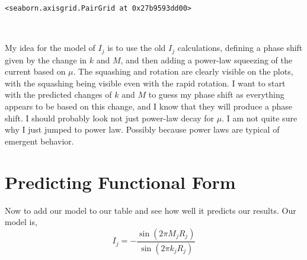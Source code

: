 \documentclass[11pt]{article}
\makeatletter
\newcommand{\boxspacing}{\kern\kvtcb@left@rule\kern\kvtcb@boxsep}
\newcommand{\prompt}[4]{
        {\ttfamily\llap{{\color{#2}[#3]:\hspace{3pt}#4}}\vspace{-\baselineskip}}
    }
\makeatother
\begin{document}
            \begin{tcolorbox}[breakable, size=fbox, boxrule=.5pt, pad at break*=1mm, opacityfill=0]
\prompt{Out}{outcolor}{25}{\boxspacing}
\begin{Verbatim}[commandchars=\\\{\}]
<seaborn.axisgrid.PairGrid at 0x27b9593dd00>
\end{Verbatim}
\end{tcolorbox}
        
    \begin{center}
    \end{center}
    { \hspace*{\fill} \\}
    
    My idea for the model of \(I_j\) is to use the old \(I_j\) calculations,
defining a phase shift given by the change in \(k\) and \(M\), and then
adding a power-law squeezing of the current based on \(\mu\). The
squashing and rotation are clearly visible on the plots, with the
squashing being visible even with the rapid rotation. I want to start
with the predicted changes of \(k\) and \(M\) to guess my phase shift as
everything appears to be based on this change, and I know that they will
produce a phase shift. I should probably look not just power-law decay
for \(\mu\). I am not quite sure why I just jumped to power law.
Possibly because power laws are typical of emergent behavior.

    \hypertarget{predicting-functional-form}{%
\section{Predicting Functional Form}\label{predicting-functional-form}}

    Now to add our model to our table and see how well it predicts our
results. Our model is, \begin{equation}
I_j = - \frac{\sin\left(2 \pi M_j R_j\right)}{\sin\left(2 \pi k_j R_j\right)}
\end{equation}
\end{document}
